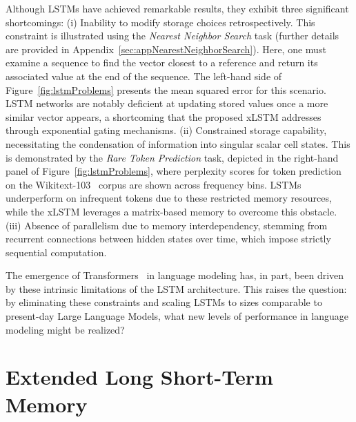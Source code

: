 Although LSTMs have achieved remarkable results, they exhibit three significant shortcomings: (i) Inability to modify storage choices retrospectively. This constraint is illustrated using the {\it Nearest Neighbor Search} task (further details are provided in Appendix~\ref{sec:appNearestNeighborSearch}). Here, one must examine a sequence to find the vector closest to a reference and return its associated value at the end of the sequence. The left-hand side of Figure~\ref{fig:lstmProblems} presents the mean squared error for this scenario. LSTM networks are notably deficient at updating stored values once a more similar vector appears, a shortcoming that the proposed xLSTM addresses through exponential gating mechanisms. (ii) Constrained storage capability, necessitating the condensation of information into singular scalar cell states. This is demonstrated by the {\it Rare Token Prediction} task, depicted in the right-hand panel of Figure~\ref{fig:lstmProblems}, where perplexity scores for token prediction on the Wikitext-103~\citep{Merity:17} corpus are shown across frequency bins. LSTMs underperform on infrequent tokens due to these restricted memory resources, while the xLSTM leverages a matrix-based memory to overcome this obstacle. (iii) Absence of parallelism due to memory interdependency, stemming from recurrent connections between hidden states over time, which impose strictly sequential computation. 

The emergence of Transformers~\citep{Vaswani:17} in language modeling has, in part, been driven by these intrinsic limitations of the LSTM architecture. This raises the question: by eliminating these constraints and scaling LSTMs to sizes comparable to present-day Large Language Models, what new levels of performance in language modeling might be realized?

\section{Extended Long Short-Term Memory}
\label{sec:xLSTM}

